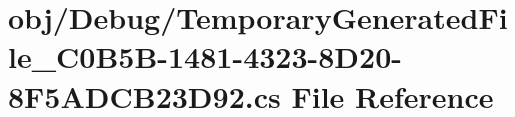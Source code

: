 \hypertarget{_temporary_generated_file__036_c0_b5_b-1481-4323-8_d20-8_f5_a_d_c_b23_d92_8cs}{}\section{obj/\+Debug/\+Temporary\+Generated\+File\+\_\+C0\+B5\+B-\/1481-\/4323-\/8\+D20-\/8\+F5\+A\+D\+C\+B23\+D92.cs File Reference}
\label{_temporary_generated_file__036_c0_b5_b-1481-4323-8_d20-8_f5_a_d_c_b23_d92_8cs}
